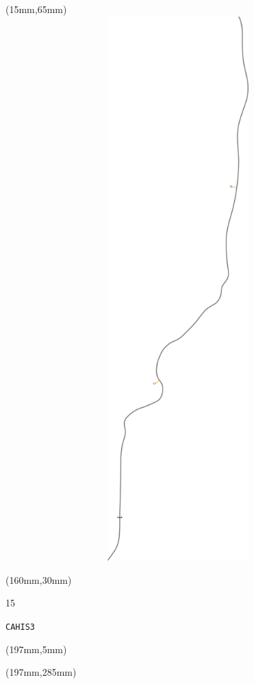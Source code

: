 \begin{textblock*}{185mm}(15mm,65mm)%
\centering
\mbox{\includegraphics[width=185mm,height=210mm,keepaspectratio]{PT/CAHIS3.pdf}}
\end{textblock*}
\begin{textblock*}{40mm}(160mm,30mm)%
\Large
\par{} 
\par15 
\par\hfill\tiny\tt CAHIS3\\
\end{textblock*}
\begin{textblock*}{20mm}(197mm,5mm)%
\fbox{\thepage}
\label{CAHIS3}
\end{textblock*}
\begin{textblock*}{20mm}(197mm,285mm)%
\fbox{\thepage}
\end{textblock*}

